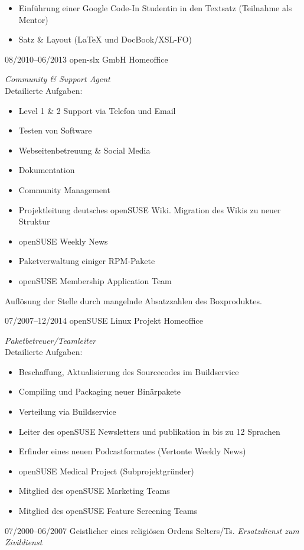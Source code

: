 \documentclass[a4paper,latin]{friggeri-cv} %
\begin{document}
\begin{entrylist}
{\begin{itemize}
\item Einführung einer Google Code-In Studentin in den Textsatz (Teilnahme als Mentor)
\item Satz \& Layout (\LaTeX{} und DocBook/XSL-FO)
\end{itemize}
}
\entry
{08/2010--06/2013}
{open-slx GmbH}
{Homeoffice}
{\emph{Community \& Support Agent} \\
Detailierte Aufgaben:
\begin{itemize}
\item Level 1 \& 2 Support via Telefon und Email
\item Testen von Software
\item Webseitenbetreuung \& Social Media
\item Dokumentation
\item Community Management
\item Projektleitung deutsches openSUSE Wiki. Migration des Wikis zu neuer Struktur
\item openSUSE Weekly News
\item Paketverwaltung einiger RPM-Pakete
\item openSUSE Membership Application Team
\end{itemize}
Auflösung der Stelle durch mangelnde Absatzzahlen des Boxproduktes.
}
\end{entrylist}
\begin{entrylist}
\entry
{07/2007--12/2014}
{openSUSE Linux Projekt}
{Homeoffice}
{\emph{Paketbetreuer/Teamleiter}\\
Detailierte Aufgaben:
\begin{itemize}
\item Beschaffung, Aktualisierung des Sourcecodes im Buildservice
\item Compiling und Packaging neuer Binärpakete
\item Verteilung via Buildservice
\item Leiter des openSUSE Newsletters und publikation in bis zu 12 Sprachen
\item Erfinder eines neuen Podcastformates (Vertonte Weekly News)
\item openSUSE Medical Project (Subprojektgründer)
\item Mitglied des openSUSE Marketing Teams
\item Mitglied des openSUSE Feature Screening Teams
\end{itemize}
}
\entry
{07/2000--06/2007}
{Geistlicher eines religiösen Ordens}
{Selters/Ts.}
{\emph{Ersatzdienst zum Zivildienst}}
\end{entrylist}
\end{document}
